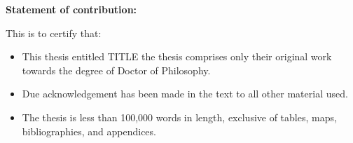 


\bfseries{Statement of contribution:}\mdseries\\
\vspace{1.0cm}

This is to certify that:\\

\begin{itemize}

\item This thesis entitled TITLE the thesis comprises only their original work towards the degree of Doctor of Philosophy.

\item Due acknowledgement has been made in the text to all other material used.

\item The thesis is less than 100,000 words in length, exclusive of tables, maps, bibliographies, and appendices.

\end{itemize}

\vspace{4.0cm}



